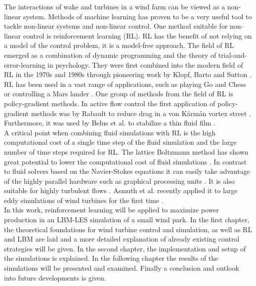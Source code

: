 The interactions of wake and turbines in a wind farm can be viewed as a non-linear system. Methods of machine learning has proven to be a very useful tool to tackle non-linear systems and non-linear control. One method suitable for non-linear control is reinforcement learning (RL). RL has the benefit of not relying on a model of the control problem, it is a model-free approach. The field of RL emerged as a combination  of dynamic programming and the theory of trial-and-error-learning in psychology. They were first combined into the modern field of RL in the 1970s and 1980s through pioneering work by Klopf, Barto and Sutton \cite[p. 20-21]{sutton_reinforcement_2018}. RL has been used in a vast range of applications, such as playing Go and Chess \cite{silver_general_2018} or controlling a Mars lander  \cite{gaudet_deep_2020}. One group of methods from the field of RL is policy-gradient methods. In active flow control the first application of policy-gradient methods was by Rabault to reduce drag in a von Kármán vortex street \cite{rabault_artificial_2019}. Furthermore, it was used by Belus et al. to stabilize a thin fluid film \cite{belus_exploiting_2019}. \\
A critical point when combining fluid simulations with RL is the high computational cost of a single time step of the fluid simulation and the large number of time steps required for RL. The lattice Boltzmann method has shown great potential to lower the computational cost of fluid simulations \cite{lohner_towards_2019}. In contrast to fluid solvers based on the Navier-Stokes equations it can easily take advantage of the highly parallel hardware such as graphical processing units \cite{kutscher_multiscale_2019}. It is also suitable for highly turbulent flows \cite{gehrke_scrutinizing_2017}. Asmuth et al. recently applied it to large eddy simulations of wind turbines for the first time \cite{asmuth_actuator_2019}.\\
In this work, reinforcement learning will be applied to maximize power production in an LBM-LES simulation of a small wind park. In the first chapter, the theoretical foundations for wind turbine control and simulation, as well as RL and LBM are laid and a more detailed explanation of already existing control strategies will be given. In the second chapter, the implementation and setup of the simulations is explained. In the following chapter the results of the simulations will be presented and examined. Finally a conclusion and outlook into future developments is given.